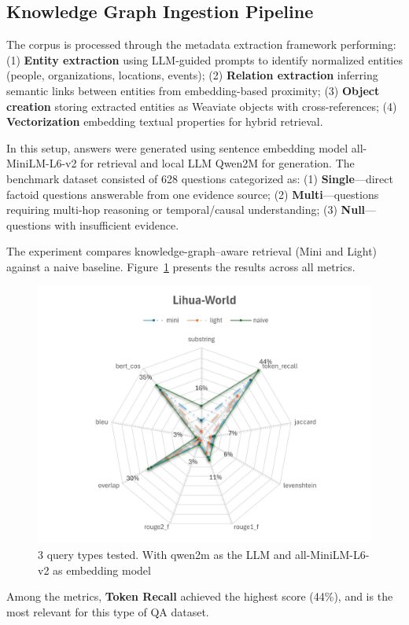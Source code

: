 \subsection{Knowledge Graph Ingestion Pipeline}

The corpus is processed through the metadata extraction framework performing: (1) \textbf{Entity extraction} using LLM-guided prompts to identify normalized entities (people, organizations, locations, events); (2) \textbf{Relation extraction} inferring semantic links between entities from embedding-based proximity; (3) \textbf{Object creation} storing extracted entities as Weaviate objects with cross-references; (4) \textbf{Vectorization} embedding textual properties for hybrid retrieval.


In this setup, answers were generated using sentence embedding model all-MiniLM-L6-v2 for retrieval and local LLM Qwen2M for generation. The benchmark dataset consisted of 628 questions categorized as: (1) \textbf{Single}—direct factoid questions answerable from one evidence source; (2) \textbf{Multi}—questions requiring multi-hop reasoning or temporal/causal understanding; (3) \textbf{Null}—questions with insufficient evidence.

The experiment compares knowledge-graph–aware retrieval (Mini and Light) against a naive baseline.
Figure~\ref{fig:Lihua-World} presents the results across all metrics.
\begin{figure}[H]
    \centering
    \includegraphics[width=1\linewidth]{Figures/Lihua-World.jpg}
    \caption{3 query types tested. With qwen2m as the \gls{LLM} and all-MiniLM-L6-v2 as embedding model}
    \label{fig:Lihua-World}
\end{figure}
Among the metrics, \textbf{Token Recall} achieved the highest score (44\%), and is the most relevant for this type of QA dataset.

